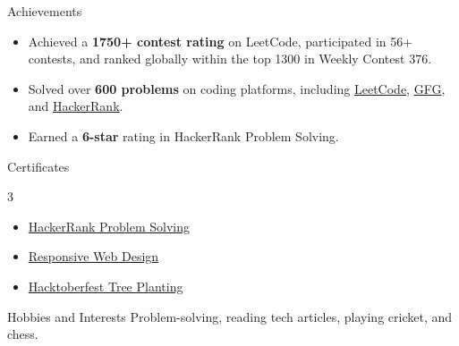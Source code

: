 \documentclass{resume} %
\begin{document}
\begin{rSection}{Achievements}
\begin{itemize}
    \item Achieved a \textbf{1750+ contest rating} on LeetCode, participated in 56+ contests, and ranked globally within the top 1300 in Weekly Contest 376.
    \item Solved over \textbf{600 problems} on coding platforms, including \href{https://leetcode.com/u/Roshan_kumar7989/}{LeetCode}, \href{https://auth.geeksforgeeks.org/user/roshan_sahu/}{GFG}, and \href{https://www.hackerrank.com/rsahu7989}{HackerRank}.
    \item Earned a \textbf{6-star} rating in HackerRank Problem Solving.
\end{itemize}
\end{rSection}

\begin{rSection}{Certificates}
\begin{multicols}{3}
\begin{itemize}
    \item \href{https://www.hackerrank.com/certificates/73bb80c83be4}{HackerRank Problem Solving}
    \item \href{https://www.freecodecamp.org/certification/Roshan_kumar7989/responsive-web-design}{Responsive Web Design}
    \item \href{https://tree-nation.com/certificate/6525e97fbca2d}{Hacktoberfest Tree Planting}
\end{itemize}
\end{multicols}
\end{rSection}

\begin{rSection}{Hobbies and Interests}
Problem-solving, reading tech articles, playing cricket, and chess.
\end{rSection}
\end{document}
